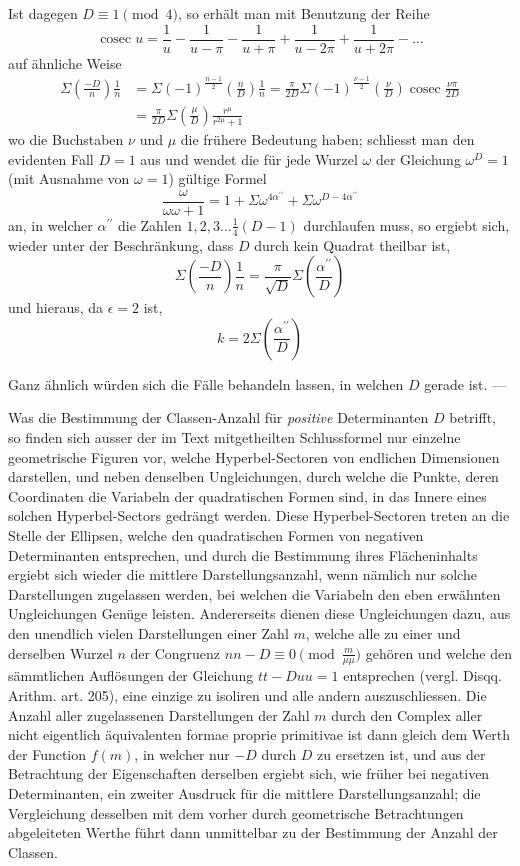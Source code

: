 Ist dagegen $D\equiv1\pmod4$, so erhält man mit Benutzung der Reihe
\[
\operatorname{cosec}u=\frac1u-\frac1{u-\pi}-\frac1{u+\pi}+\frac1{u-2\pi}+\frac1{u+2\pi}-\ldots
\]
auf ähnliche Weise
\[
\begin{aligned}
\Sigma\left(\frac{-D}n\right)\frac1n&=\Sigma(-1)^{\frac{n-1}2}\left(\frac nD\right)\frac1n
=\frac\pi{2D}\Sigma(-1)^{\frac{\nu-1}2}\left(\frac\nu D\right)\operatorname{cosec}\frac{\nu\pi}{2D}\\
&=\frac\pi{2D}\Sigma\left(\frac\mu D\right)\frac{r^\mu}{r^{2\mu}+1}
\end{aligned}
\]
wo die Buchstaben $\nu$ und $\mu$ die frühere Bedeutung haben; schliesst man den evidenten Fall $D=1$ aus und wendet die für jede Wurzel $\omega$ der Gleichung $\omega^D=1$ (mit Ausnahme von $\omega=1$) gültige Formel
\[
\frac\omega{\omega\omega+1}=1+\Sigma\omega^{4\alpha^{\prime\prime}}+\Sigma\omega^{D-4\alpha^{\prime\prime}}
\]
an, in welcher $\alpha^{\prime\prime}$ die Zahlen $1,2,3\ldots\frac14(D-1)$ durchlaufen muss, so ergiebt sich, wieder unter der Beschränkung, dass $D$ durch kein Quadrat theilbar ist,
\[
\Sigma\left(\frac{-D}n\right)\frac1n=\frac\pi{\surd D}\Sigma\left(\frac{\alpha^{\prime\prime}}D\right)
\]
und hieraus, da $\epsilon=2$ ist,
\[
k=2\Sigma\left(\frac{\alpha^{\prime\prime}}D\right)
\]

Ganz ähnlich würden sich die Fälle behandeln lassen, in welchen $D$ gerade ist. —

Was die Bestimmung der Classen-Anzahl für \emph{positive} Determinanten $D$ betrifft, so finden sich ausser der im Text mitgetheilten Schlussformel nur einzelne geometrische Figuren vor, welche Hyperbel-Sectoren von endlichen Dimensionen darstellen, und neben denselben Ungleichungen, durch welche die Punkte, deren Coordinaten die Variabeln der quadratischen Formen sind, in das Innere eines solchen Hyperbel-Sectors gedrängt werden. Diese Hyperbel-Sectoren treten an die Stelle der Ellipsen, welche den quadratischen Formen von negativen Determinanten entsprechen, und durch die Bestimmung ihres Flächeninhalts ergiebt sich wieder die mittlere Darstellungsanzahl, wenn nämlich nur solche Darstellungen zugelassen werden, bei welchen die Variabeln den eben erwähnten Ungleichungen Genüge leisten. Andererseits dienen diese Ungleichungen dazu, aus den unendlich vielen Darstellungen einer Zahl $m$, welche alle zu einer und derselben Wurzel $n$ der Congruenz $nn-D\equiv0\pmod{\frac m{\mu\mu}}$ gehören und welche den sämmtlichen Auflösungen der Gleichung $tt-Duu=1$ entsprechen (vergl. Disqq. Arithm. art. 205), eine einzige zu isoliren und alle andern auszuschliessen. Die Anzahl aller zugelassenen Darstellungen der Zahl $m$ durch den Complex aller nicht eigentlich äquivalenten formae proprie primitivae ist dann gleich dem Werth der Function $f(m)$, in welcher nur $-D$ durch $D$ zu ersetzen ist, und aus der Betrachtung der Eigenschaften derselben ergiebt sich, wie früher bei negativen Determinanten, ein zweiter Ausdruck für die mittlere Darstellungsanzahl; die Vergleichung desselben mit dem vorher durch geometrische Betrachtungen abgeleiteten Werthe führt dann unmittelbar zu der Bestimmung der Anzahl der Classen.
\BookRule{35mm}

